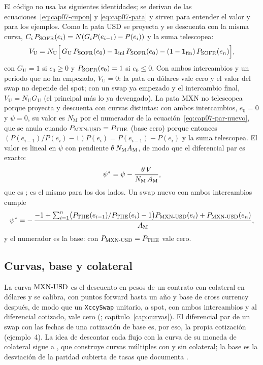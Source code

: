 El código no usa las siguientes identidades; se derivan de las ecuaciones~\eqref{eq:cap07-cupon} y
\eqref{eq:cap07-pata} y sirven para entender el valor y para los ejemplos. Como la pata USD se proyecta y se
descuenta con la misma curva, $C_i\,P_{\mathrm{SOFR}}(e_i)=N(G_iP(e_{i-1})-P(e_i))$ y la suma telescopea:
\begin{equation}\label{eq:cap07-pata-usd}
  V_{\mathrm U} = N_{\mathrm U}\Bigl[\,G_{\mathrm U}\,P_{\mathrm{SOFR}}(e_0) - \mathbf 1_{\mathrm{ini}}\,P_{\mathrm{SOFR}}(e_0)
  - (1-\mathbf 1_{\mathrm{fin}})\,P_{\mathrm{SOFR}}(e_n)\Bigr],
\end{equation}
con $G_{\mathrm U}=1$ si $e_0\ge0$ y $P_{\mathrm{SOFR}}(e_0)=1$ si $e_0\le0$. Con ambos intercambios y un periodo que
no ha empezado, $V_{\mathrm U}=0$: la pata en dólares vale cero y el valor del swap no depende del spot; con un
swap ya empezado y el intercambio final, $V_{\mathrm U}=N_{\mathrm U}G_{\mathrm U}$ (el principal más lo ya
devengado). La pata MXN no telescopea porque proyecta y descuenta con curvas distintas: con ambos intercambios, $e_0=0$ y
$\psi=0$, su valor es $N_{\mathrm M}$ por el numerador de la ecuación~\eqref{eq:cap07-par-nuevo}, que se anula
cuando $P_{\mathrm{MXN\text{-}USD}}=P_{\mathrm{TIIE}}$ (base cero) porque entonces
$(P(e_{i-1})/P(e_i)-1)P(e_i)=P(e_{i-1})-P(e_i)$ y la suma telescopea. El valor es lineal en $\psi$ con pendiente
$\theta\,N_{\mathrm M}A_{\mathrm M}$, de modo que el diferencial par es exacto:
\begin{equation}\label{eq:cap07-spread-par}
  \psi^{*} = \psi - \frac{\theta\,V}{N_{\mathrm M}\,A_{\mathrm M}},
\end{equation}
que es ; es el mismo para los dos lados. Un swap nuevo
con ambos intercambios cumple
\begin{equation}\label{eq:cap07-par-nuevo}
  \psi^{*} = -\,\frac{-1+\sum_{i=1}^{n}\bigl(P_{\mathrm{TIIE}}(e_{i-1})/P_{\mathrm{TIIE}}(e_i)-1\bigr)P_{\mathrm{MXN\text{-}USD}}(e_i)+P_{\mathrm{MXN\text{-}USD}}(e_n)}
  {A_{\mathrm M}} ,
\end{equation}
y el numerador es la base: con $P_{\mathrm{MXN\text{-}USD}}=P_{\mathrm{TIIE}}$ vale cero.

\subsection{Curvas, base y colateral}\label{sec:cap07-curvas}

La curva $\mathrm{MXN\text{-}USD}$ es el descuento en pesos de un contrato con colateral en dólares y se calibra, con puntos
forward hasta un año y base de cross currency después, de modo que un \texttt{XccySwap} unitario, a spot, con
ambos intercambios y al diferencial cotizado, vale cero
(; capítulo~\ref{cap:curvas}). El
diferencial par de un swap con las fechas de una cotización de base es, por eso, la propia cotización
(ejemplo~4). La idea de descontar cada flujo con la curva de su moneda de colateral sigue a \citet{fujii2009}, que construye curvas múltiples con y sin colateral; la base es la desviación de la paridad
cubierta de tasas que documenta \citet{du2018}.

